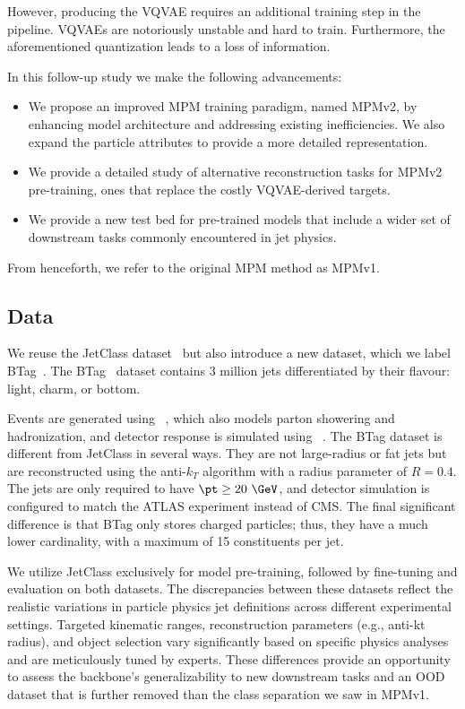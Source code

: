 However, producing the VQVAE requires an additional training step in the pipeline. VQVAEs are notoriously unstable and hard to train.
Furthermore, the aforementioned quantization leads to a loss of information.

In this follow-up study we make the following advancements:
\begin{itemize}
    \item We propose an improved MPM training paradigm, named MPMv2, by enhancing model architecture and addressing existing inefficiencies. We also expand the particle attributes to provide a more detailed representation.
    \item We provide a detailed study of alternative reconstruction tasks for MPMv2 pre-training, ones that replace the costly VQVAE-derived targets.
    \item We provide a new test bed for pre-trained models that include a wider set of downstream tasks commonly encountered in jet physics.
\end{itemize}
From henceforth, we refer to the original MPM method as MPMv1.

\subsection{Data}

We reuse the JetClass dataset~\cite{JetClass} but also introduce a new dataset, which we label BTag~\cite{btag}.
The BTag~\cite{btag} dataset contains 3 million jets differentiated by their flavour: light, charm, or bottom.

Events are generated using \pythia~\cite{Pythia8}, which also models parton showering and hadronization, and detector response is simulated using \delphes~\cite{Delphes}.
The BTag dataset is different from JetClass in several ways.
They are not large-radius or fat jets but are reconstructed using the anti-$k_T$ algorithm with a radius parameter of $R=0.4$.
The jets are only required to have $\pt \geq 20~\GeV$, and detector simulation is configured to match the ATLAS experiment instead of CMS.
The final significant difference is that BTag only stores charged particles; thus, they have a much lower cardinality, with a maximum of 15 constituents per jet.

We utilize JetClass exclusively for model pre-training, followed by fine-tuning and evaluation on both datasets.
The discrepancies between these datasets reflect the realistic variations in particle physics jet definitions across different experimental settings.
Targeted kinematic ranges, reconstruction parameters (e.g., anti-kt radius), and object selection vary significantly based on specific physics analyses and are meticulously tuned by experts.
These differences provide an opportunity to assess the backbone's generalizability to new downstream tasks and an OOD dataset that is further removed than the class separation we saw in MPMv1.

